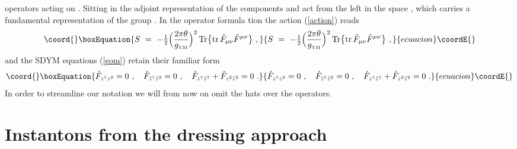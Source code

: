 \documentclass[a4paper,11pt,english]{article}
\numberwithin{equation}{section}
\providecommand{\Tr}[1]{\operatorname{Tr #1}}
\providecommand{\tr}[1]{\operatorname{tr}#1}
\providecommand{\sfrac}[2]{{\textstyle\frac{#1}{#2}}}
\renewcommand{\=}{\ =\ }
\begin{document}
operators acting on \coordHE{}. 
Sitting in the adjoint representation of \coordHE{}
the components \coordHE{} and \coordHE{} act from the left in the space 
\coordHE{}, 
which carries %
a fundamental representation of the group \coordHE{}. In the operator formula%
tion the action (\ref{action}) reads
\begin{equation}\coord{}\boxEquation{
 S\=-\sfrac{1}{2}\Bigl(\frac{2\pi\theta}{g_{\text{\tiny YM}}}\Bigr)^2
 \Tr{}\bigl\{\tr{}{\hat{F}}_{\mu\nu}{\hat{F}}^{\mu\nu}\bigr\}\ ,
}{
 S\=-\sfrac{1}{2}\Bigl(\frac{2\pi\theta}{g_{\text{\tiny YM}}}\Bigr)^2
 \Tr{}\bigl\{\tr{}{\hat{F}}_{\mu\nu}{\hat{F}}^{\mu\nu}\bigr\}\ ,
}{ecuacion}\coordE{}\end{equation}
and the SDYM equations (\ref{eom}) retain their familiar form
\begin{equation}\coord{}\boxEquation{\label{eom-2}
 \hat{{F}}_{z^1z^2}=0\ ,\quad
 \hat{{F}}_{\bar{z}^1\bar{z}^2}=0\ ,\quad
 \hat{{F}}_{z^1\bar{z}^1}+\hat{{F}}_{z^2\bar{z}^2}=0\ .
}{\hat{{F}}_{z^1z^2}=0\ ,\quad
 \hat{{F}}_{\bar{z}^1\bar{z}^2}=0\ ,\quad
 \hat{{F}}_{z^1\bar{z}^1}+\hat{{F}}_{z^2\bar{z}^2}=0\ .
}{ecuacion}\coordE{}\end{equation}
In order to streamline our notation we will from now on omit the hats %
over the operators.


\section{Instantons from the dressing approach}
\end{document}
